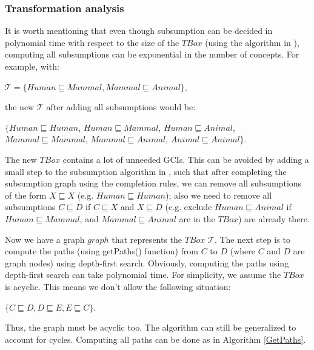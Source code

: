 \subsubsection{Transformation analysis}
It is worth mentioning that even though subsumption can be decided in polynomial time with respect to the size of the $TBox$ (using the algorithm in \cite{small}), computing all subsumptions can be exponential in the number of concepts. For example, with:
\begin{center} 
$\mathcal{T} = \{Human \sqsubseteq Mammal, Mammal \sqsubseteq Animal\}$, 
\end{center}
the new $\mathcal{T}$ after adding all subsumptions would be: 
\begin{center}
$\{Human \sqsubseteq Human$, $Human \sqsubseteq Mammal$, $Human \sqsubseteq Animal$, $Mammal \sqsubseteq Mammal$, $Mammal \sqsubseteq Animal$, $Animal \sqsubseteq Animal\}$. 
\end{center}
The new $TBox$ contains a lot of unneeded GCIs. This can be avoided by adding a small step to the subsumption algorithm in \cite{small}, such that after completing the subsumption graph using the completion rules, we can remove all subsumptions of the form $X \sqsubseteq X$ (e.g. $Human \sqsubseteq Human$); also we need to remove all subsumptions $C \sqsubseteq D$ if $C \sqsubseteq X$ and $X \sqsubseteq D$ (e.g. exclude $Human \sqsubseteq Animal$ if $Human \sqsubseteq Mammal$, and $Mammal \sqsubseteq Animal$ are in the $TBox$) are already there.

Now we have a graph $graph$ that represents the $TBox$ $\mathcal{T}$. The next step is to compute the paths (using getPaths() function) from $C$ to $D$ (where $C$ and $D$ are graph nodes) using depth-first search. Obviously, computing the paths using depth-first search can take polynomial time. For simplicity, we assume the $TBox$ is acyclic. This means we don't allow the following situation:
\begin{center}
$\lbrace C \sqsubseteq D , D \sqsubseteq E , E \sqsubseteq C \rbrace$.
\end{center}
Thus, the graph must be acyclic too. The algorithm can still be generalized to account for cycles. Computing all paths can be done as in Algorithm \ref{GetPaths}.

